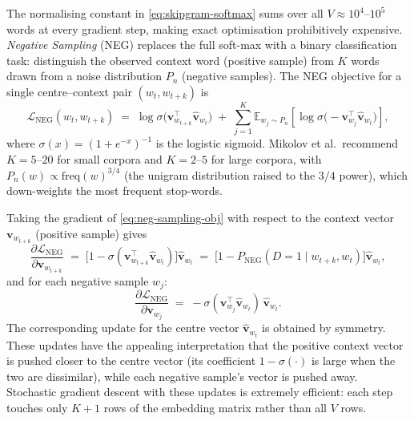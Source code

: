 \begin{deepdive}
The normalising constant in \eqref{eq:skipgram-softmax} sums over
all $V \approx 10^4$--$10^5$ words at every gradient step, making
exact optimisation prohibitively expensive.  \emph{Negative Sampling}
(NEG) replaces the full soft-max with a binary classification task:
distinguish the observed context word (positive sample) from $K$
words drawn from a noise distribution $P_n$ (negative samples).  The
NEG objective for a single centre--context pair $(w_t, w_{t+k})$ is
\begin{equation}
  \mathcal{L}_{\mathrm{NEG}}(w_t, w_{t+k})
  \;=\;
  \log \sigma\!\bigl(\mathbf{v}_{w_{t+k}}^{\top} \hat{\mathbf{v}}_{w_t}\bigr)
  \;+\;
  \sum_{j=1}^{K}
  \mathbb{E}_{w_j \sim P_n}\!\left[
    \log \sigma\!\bigl(-\mathbf{v}_{w_j}^{\top} \hat{\mathbf{v}}_{w_t}\bigr)
  \right],
  \label{eq:neg-sampling-obj}
\end{equation}
where $\sigma(x) = (1 + e^{-x})^{-1}$ is the logistic sigmoid.
Mikolov et al.\ recommend $K = 5$--$20$ for small corpora and $K = 2$--$5$
for large corpora, with $P_n(w) \propto \text{freq}(w)^{3/4}$ (the
unigram distribution raised to the $3/4$ power), which down-weights
the most frequent stop-words.

Taking the gradient of \eqref{eq:neg-sampling-obj} with respect to the
context vector $\mathbf{v}_{w_{t+k}}$ (positive sample) gives
\begin{equation}
  \frac{\partial \mathcal{L}_{\mathrm{NEG}}}{\partial \mathbf{v}_{w_{t+k}}}
  \;=\;
  \bigl[1 - \sigma(\mathbf{v}_{w_{t+k}}^{\top} \hat{\mathbf{v}}_{w_t})\bigr]
  \hat{\mathbf{v}}_{w_t}
  \;=\;
  \bigl[1 - P_{\mathrm{NEG}}(D=1 \mid w_{t+k}, w_t)\bigr]\hat{\mathbf{v}}_{w_t},
  \label{eq:neg-grad-pos}
\end{equation}
and for each negative sample $w_j$:
\begin{equation}
  \frac{\partial \mathcal{L}_{\mathrm{NEG}}}{\partial \mathbf{v}_{w_j}}
  \;=\;
  -\sigma(\mathbf{v}_{w_j}^{\top} \hat{\mathbf{v}}_{w_t})\,\hat{\mathbf{v}}_{w_t}.
  \label{eq:neg-grad-neg}
\end{equation}
The corresponding update for the centre vector $\hat{\mathbf{v}}_{w_t}$ is
obtained by symmetry.  These updates have the appealing interpretation
that the positive context vector is pushed closer to the centre vector
(its coefficient $1 - \sigma(\cdot)$ is large when the two are
dissimilar), while each negative sample's vector is pushed away.
Stochastic gradient descent with these updates is extremely efficient:
each step touches only $K + 1$ rows of the embedding matrix rather
than all $V$ rows.


\end{deepdive}
